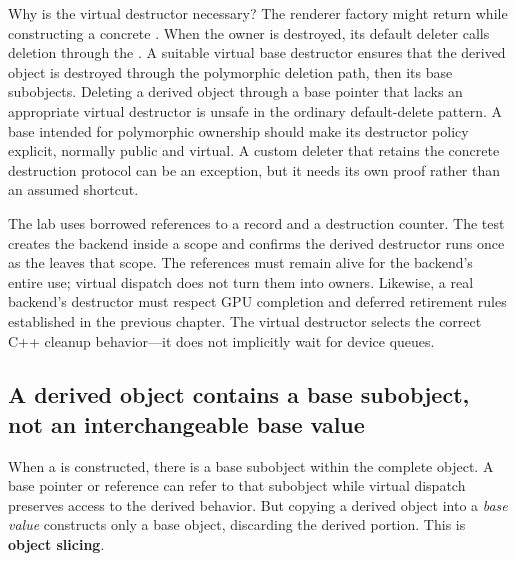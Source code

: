 Why is the virtual destructor necessary? The renderer factory might return  while constructing a concrete . When the owner is destroyed, its default deleter calls deletion through the . A suitable virtual base destructor ensures that the derived object is destroyed through the polymorphic deletion path, then its base subobjects. Deleting a derived object through a base pointer that lacks an appropriate virtual destructor is unsafe in the ordinary default-delete pattern. A base intended for polymorphic ownership should make its destructor policy explicit, normally public and virtual. A custom deleter that retains the concrete destruction protocol can be an exception, but it needs its own proof rather than an assumed shortcut.

The lab uses borrowed references to a  record and a destruction counter. The test creates the backend inside a scope and confirms the derived destructor runs once as the  leaves that scope. The references must remain alive for the backend's entire use; virtual dispatch does not turn them into owners. Likewise, a real backend's destructor must respect GPU completion and deferred retirement rules established in the previous chapter. The virtual destructor selects the correct C++ cleanup behavior---it does not implicitly wait for device queues.

\subsection{A derived object contains a base subobject, not an interchangeable base value}\label{01-foundations-i-ch004-a-derived-object-contains-a-base-subobject-not-an-interchangeable-base-value}

\hypertarget{01-foundations-i-ch004-a-derived-object-contains-a-base-subobject-not-an-interchangeable-base-value}{}

When a  is constructed, there is a  base subobject within the complete object. A base pointer or reference can refer to that subobject while virtual dispatch preserves access to the derived behavior. But copying a derived object into a \emph{base value} constructs only a base object, discarding the derived portion. This is \textbf{object slicing}.

